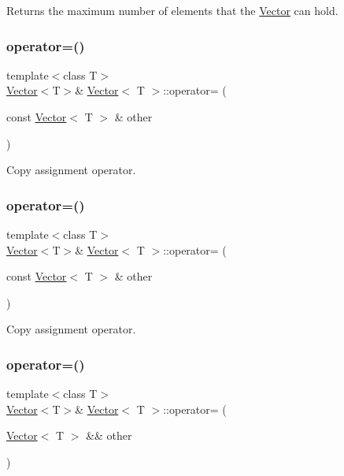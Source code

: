 Returns the maximum number of elements that the \hyperlink{classVector}{Vector} can hold. \mbox{\label{classVector_a9b191182bc58811b1f40a62626d3168d}} 
\subsubsection{\texorpdfstring{operator=()}{operator=()}\hspace{0.1cm}{\footnotesize\ttfamily [1/4]}}
{\footnotesize\ttfamily template$<$class T$>$ \\
\hyperlink{classVector}{Vector}$<$T$>$\& \hyperlink{classVector}{Vector}$<$ T $>$\+::operator= (\begin{DoxyParamCaption}\item[{const \hyperlink{classVector}{Vector}$<$ T $>$ \&}]{other }\end{DoxyParamCaption})\hspace{0.3cm}{\ttfamily [inline]}}

Copy assignment operator. \mbox{\label{classVector_a9b191182bc58811b1f40a62626d3168d}} 
\subsubsection{\texorpdfstring{operator=()}{operator=()}\hspace{0.1cm}{\footnotesize\ttfamily [2/4]}}
{\footnotesize\ttfamily template$<$class T$>$ \\
\hyperlink{classVector}{Vector}$<$T$>$\& \hyperlink{classVector}{Vector}$<$ T $>$\+::operator= (\begin{DoxyParamCaption}\item[{const \hyperlink{classVector}{Vector}$<$ T $>$ \&}]{other }\end{DoxyParamCaption})\hspace{0.3cm}{\ttfamily [inline]}}

Copy assignment operator. \mbox{\label{classVector_ac4cedd399454463a0e9bdf6defd09a04}} 
\subsubsection{\texorpdfstring{operator=()}{operator=()}\hspace{0.1cm}{\footnotesize\ttfamily [3/4]}}
{\footnotesize\ttfamily template$<$class T$>$ \\
\hyperlink{classVector}{Vector}$<$T$>$\& \hyperlink{classVector}{Vector}$<$ T $>$\+::operator= (\begin{DoxyParamCaption}\item[{\hyperlink{classVector}{Vector}$<$ T $>$ \&\&}]{other }\end{DoxyParamCaption})\hspace{0.3cm}{\ttfamily [inline]}}

